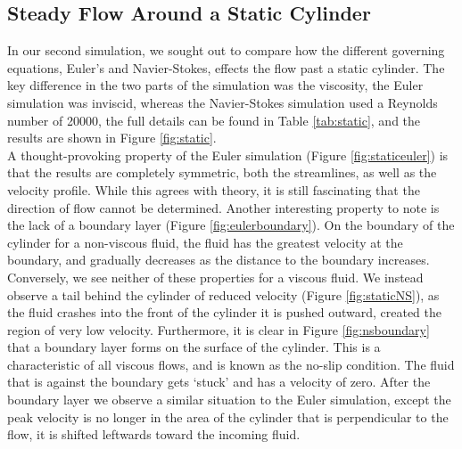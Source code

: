 \documentclass[10pt, titlepage]{article}
\begin{document}
\subsection{Steady Flow Around a Static Cylinder}

In our second simulation, we sought out to compare how the different governing equations, Euler's and Navier-Stokes, effects the flow past a static cylinder. The key difference in the two parts of the simulation was the viscosity, the Euler simulation was inviscid, whereas the Navier-Stokes simulation used a Reynolds number of 20000, the full  details can be found in Table \ref{tab:static}, and the results are shown in Figure \ref{fig:static}. \\

A thought-provoking property of the Euler simulation (Figure \ref{fig:staticeuler}) is that the results are completely symmetric, both the streamlines, as well as the velocity profile. While this agrees with theory, it is still fascinating that the direction of flow cannot be determined. Another interesting property to note is the lack of a boundary layer (Figure \ref{fig:eulerboundary}). On the boundary of the cylinder for a non-viscous fluid, the fluid has the greatest velocity at the boundary, and gradually decreases as the distance to the boundary increases. \\

Conversely, we see neither of these properties for a viscous fluid. We instead observe a tail behind the cylinder of reduced velocity (Figure \ref{fig:staticNS}), as the fluid crashes into the front of the cylinder it is pushed outward, created the region of very low velocity. Furthermore, it is clear in Figure \ref{fig:nsboundary} that a boundary layer forms on the surface of the cylinder. This is a characteristic of all viscous flows, and is known as the no-slip condition. The fluid that is against the boundary gets `stuck' and has a velocity of zero. After the boundary layer we observe a similar situation to the Euler simulation, except the peak velocity is no longer in the area of the cylinder that is perpendicular to the flow, it is shifted leftwards toward the incoming fluid.
\end{document}
